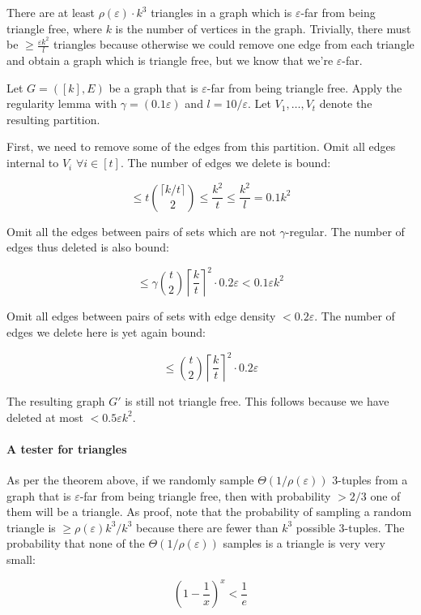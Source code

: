 \documentclass{idc_msc}
\begin{document}
There are at least \(\rho(\varepsilon) \cdot k^3\) triangles in a graph which is \(\varepsilon\)-far from being triangle free, where \(k\) is the number of vertices in the graph.
Trivially, there must be \(\ge \frac{\varepsilon k^2}{l}\) triangles because otherwise we could remove one edge from each triangle and obtain a graph which is triangle free, but we know that we're \(\varepsilon\)-far.

Let \(G=([k], E)\) be a graph that is \(\varepsilon\)-far from being triangle free.
Apply the regularity lemma with \(\gamma = (0.1\varepsilon)\) and \(l=10/\varepsilon\).
Let \(V_1,\ldots,V_t\) denote the resulting partition.

First, we need to remove some of the edges from this partition.
Omit all edges internal to \(V_i\) \(\forall i \in [t]\).
The number of edges we delete is bound:

\[
  \le t \binom{\lceil k/t \rceil}{2} \le \frac{k^2}{t} \le \frac{k^2}{l} = 0.1 k^2
\]

Omit all the edges between pairs of sets which are not \(\gamma\)-regular.
The number of edges thus deleted is also bound:

\[
  \le \gamma \binom{t}{2} \left\lceil \frac{k}{t} \right\rceil^2 \cdot 0.2 \varepsilon < 0.1 \varepsilon k^2
\]

Omit all edges between pairs of sets with edge density \(< 0.2 \varepsilon\).
The number of edges we delete here is yet again bound:

\[
  \le \binom{t}{2} \left\lceil \frac{k}{t} \right\rceil^2 \cdot 0.2 \varepsilon
\]

The resulting graph \(G'\) is still not triangle free.
This follows because we have deleted at most \(< 0.5 \varepsilon k^2\).

\paragraph{A tester for triangles}

As per the theorem above, if we randomly sample \(\Theta(1/\rho(\varepsilon))\) 3-tuples from a graph that is \(\varepsilon\)-far from being triangle free, then with probability \(> 2/3\) one of them will be a triangle.
As proof, note that the probability of sampling a random triangle is \(\ge \rho(\varepsilon) k^3 / k^3\) because there are fewer than \(k^3\) possible 3-tuples.
The probability that none of the \(\Theta(1/\rho(\varepsilon))\) samples is a triangle is very very small:

\[
  (1-\frac{1}{x})^x < \frac{1}{e}
\]
\end{document}
